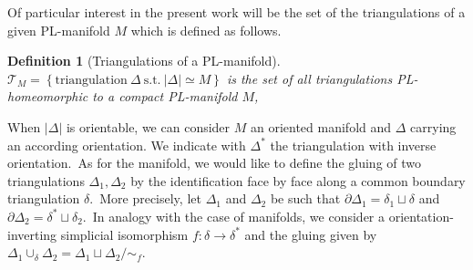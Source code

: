 \documentclass[11pt]{article}
\newcommand{\del}{\partial}
\newtheorem{definition}{Definition}[section]
\theoremstyle{definition}
\numberwithin{equation}{section}
\begin{document}
Of particular interest in the present work will be the set of the triangulations of a given PL-manifold $M$ which is defined as follows.
\begin{definition}[Triangulations of a PL-manifold]
    $\mathcal{T}_M=\left\{\text{triangulation}\ \Delta \ \text{s.t.}\ |\Delta|\simeq M\right\}$ is the set of all triangulations PL-homeomorphic to a compact PL-manifold $M$, 
\end{definition}
When $|\Delta|$ is orientable, we can consider $M$ an oriented manifold and $\Delta$ carrying an according orientation. We indicate with $\Delta^*$ the triangulation with inverse orientation.~As for the manifold, we would like to define the gluing of two triangulations $\Delta_1,\Delta_2$ by the identification face by face along a common boundary triangulation $\delta$.~More precisely, let $\Delta_1$ and $\Delta_2$ be such that $\partial\Delta_1=\delta_1\sqcup\delta$ and $\del\Delta_2=\delta^*\sqcup \delta_2$.~In analogy with the case of manifolds, we consider a orientation-inverting simplicial isomorphism $f:\delta\to\delta^*$ and the gluing given by $\Delta_1\cup_{\delta}\Delta_2=\Delta_1\sqcup\Delta_2/\sim_f$.
\end{document}
